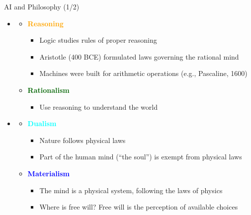 \documentclass[
  10pt,
  ignorenonframetext,
]{beamer}
\providecommand{\tightlist}{%
  \setlength{\itemsep}{0pt}\setlength{\parskip}{0pt}}
\begin{document}
\begin{frame}{AI and Philosophy (1/2)}
\label{ai-and-philosophy-12}
\begin{itemize}
\tightlist
\item
  \textbf{\textcolor{red}{\textcolor{black}{}}}

  \begin{itemize}
  \tightlist
  \item
    \textbf{\textcolor{orange}{Reasoning}}

    \begin{itemize}
    \tightlist
    \item
      Logic studies rules of proper reasoning
    \item
      Aristotle (400 BCE) formulated laws governing the rational mind
    \item
      Machines were built for arithmetic operations (e.g., Pascaline,
      1600)
    \end{itemize}
  \item
    \textbf{\textcolor{darkgreen}{Rationalism}}

    \begin{itemize}
    \tightlist
    \item
      Use reasoning to understand the world
    \end{itemize}
  \end{itemize}
\item
  \textbf{\textcolor{teal}{\textcolor{black}{}}}

  \begin{itemize}
  \tightlist
  \item
    \textbf{\textcolor{cyan}{Dualism}}

    \begin{itemize}
    \tightlist
    \item
      Nature follows physical laws
    \item
      Part of the human mind (``the soul'') is exempt from physical laws
    \end{itemize}
  \item
    \textbf{\textcolor{blue}{Materialism}}

    \begin{itemize}
    \tightlist
    \item
      The mind is a physical system, following the laws of physics
    \item
      Where is free will? Free will is the perception of available
      choices
    \end{itemize}
  \end{itemize}
\end{itemize}
\end{frame}
\end{document}
